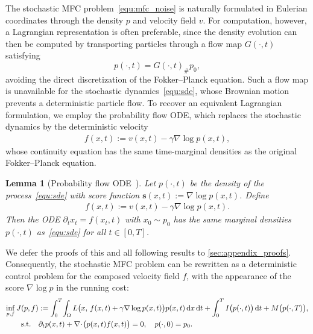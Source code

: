 \documentclass[preprint]{elsarticle}
\newtheorem{lemma}[theorem]{Lemma}
\newcommand{\dd}{\,\mathrm{d}}          \newcommand{\pdv}[2]{\dfrac{\partial #1}{\partial #2}}
\newcommand{\g}{\gamma}
\newcommand{\Om}{\Omega}
\begin{document}
The stochastic MFC problem~\eqref{equ:mfc_noise} is naturally formulated in Eulerian coordinates through the density $p$ and velocity field $v$. For computation, however, a Lagrangian representation is often preferable, since the density evolution can then be computed by transporting particles through a flow map $G(\cdot,t)$ satisfying
\[
p(\cdot,t)=G(\cdot,t)_\#p_0,
\]
avoiding the direct discretization of the Fokker--Planck equation. Such a flow map is unavailable for the stochastic dynamics~\eqref{equ:sde}, whose Brownian motion prevents a deterministic particle flow. To recover an equivalent Lagrangian formulation, we employ the probability flow ODE, which replaces the stochastic dynamics by the deterministic velocity
\begin{align}
    f(x,t):=v(x,t)-\g\nabla\log p(x,t),
\end{align}
whose continuity equation has the same time-marginal densities as the original Fokker--Planck equation.

\begin{lemma}[Probability flow ODE~\cite{anderson1982reverse}]\label{lem:prob_flow}
Let $p(\cdot,t)$ be the density of the process~\eqref{equ:sde} with score function $\mathbf{s}(x,t):=\nabla\log p(x,t)$. Define
\begin{align}
    f(x,t) := v(x,t) - \g \nabla\log p(x,t). \label{equ:prob_flow_f}
\end{align}
Then the ODE $\partial_t x_t = f(x_t,t)$ with $x_0\sim p_0$ has the same marginal densities $p(\cdot,t)$ as~\eqref{equ:sde} for all $t\in[0,T]$.
\end{lemma}
We defer the proofs of this and all following results to \ref{sec:appendix_proofs}. Consequently, the stochastic MFC problem can be rewritten as a deterministic control problem for the composed velocity field $f$, with the appearance of the score $\nabla\log p$ in the running cost:
\begin{align}
    \inf_{p,f} J(p,f)
    &:= \int_0^T\!\int_\Om
        L\qb{x,\, f(x,t)+\g\nabla\log p(x,t)}
    p(x,t)\dd x\dd t
    + \int_0^T I\qb{p(\cdot,t)}\dd t
    + M\qb{p(\cdot,T)},
    \label{equ:mfc_det}
    \\
    \text{s.t.}\quad&
    \partial_t p(x,t) + \nabla\!\cdot\!\qb{p(x,t)f(x,t)} = 0,\quad p(\cdot,0)=p_0.
    \nonumber
\end{align}
\end{document}
